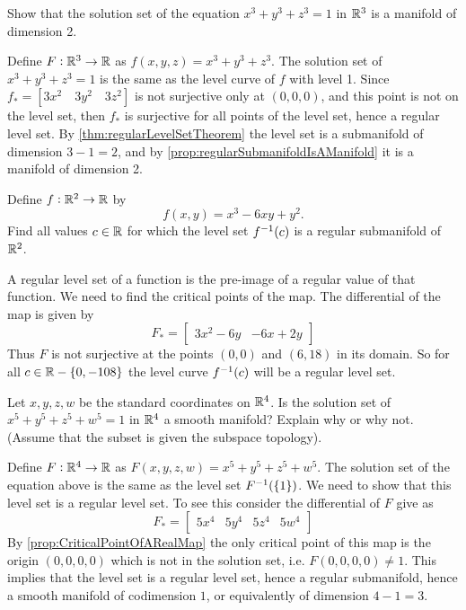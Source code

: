 \begin{problem}
	Show that the solution set of the equation $ x^3 + y^3 + z^3 = 1 $ in $ \mathbb{R}^3 $ is a manifold of dimension 2. 
\end{problem}
\begin{solution}
	Define $ F: \mathbb{R}^3 \to \mathbb{R} $ as $ f(x,y,z) = x^3 + y^3 + z^3 $. The solution set of $ x^3 + y^3 + z^3 = 1 $ is the same as the level curve of $ f $ with level 1. Since $ f_* = \left[3x^2 \quad 3y^2 \quad 3z^2 \right] $ is not surjective only at $ (0,0,0) $, and this point is not on the level set, then $ f_* $ is surjective for all points of the level set, hence a regular level set. By \autoref{thm:regularLevelSetTheorem} the level set is a submanifold of dimension $ 3-1 =2 $, and by \autoref{prop:regularSubmanifoldIsAManifold} it is a manifold of dimension 2. 
\end{solution}

\begin{problem}
	Define $ f:\mathbb{R}^2 \to \mathbb{R} $ by
	\[ f(x,y) = x^3 - 6xy + y^2. \]
	Find all values $ c \in \mathbb{R} $ for which the level set $ f^{-1}(c) $ is a regular submanifold of $ \mathbb{R}^2 $.
\end{problem}
\begin{solution}
	A regular level set of a function is the pre-image of a regular value of that function. We need to find the critical points of the map. The differential of the map is given by
	\[ F_* = \begin{bmatrix}
		3x^2-6y & -6x + 2y
	\end{bmatrix} \]
	Thus $ F $ is not surjective at the points $ (0,0) $ and $ (6,18) $ in its domain. So for all $ c \in \mathbb{R} - \{0,-108\} $ the level curve $ f^{-1}(c) $ will be a regular level set. 
\end{solution}

\begin{problem}
	Let $ x,y,z,w $ be the standard coordinates on $ \mathbb{R}^4 $. Is the solution set of $ x^5 + y^5 + z^5 + w^5 = 1 $ in $ \mathbb{R}^4 $ a smooth manifold? Explain why or why not. (Assume that the subset is given the subspace topology).
\end{problem}
\begin{solution}
	Define $ F: \mathbb{R}^4 \to \mathbb{R} $ as $ F(x,y,z,w) = x^5 + y^5 + z^5 + w^5 $. The solution  set of the equation above is the same as the level set $ F^{-1}(\{1\}) $. We need to show that this level set is a regular level set. To see this consider the differential of $ F $ give as
	\[ F_* = \begin{bmatrix}
		5x^4 & 5y^4 & 5z^4 & 5w^4
	\end{bmatrix} \]
	By \autoref{prop:CriticalPointOfARealMap} the only critical point of this map is the origin $ (0,0,0,0) $ which is not in the solution set, i.e. $ F(0,0,0,0) \neq 1 $. This implies that the level set is a regular level set, hence a regular submanifold, hence a smooth manifold of codimension $ 1 $, or equivalently of dimension $ 4-1=3 $.
\end{solution}

